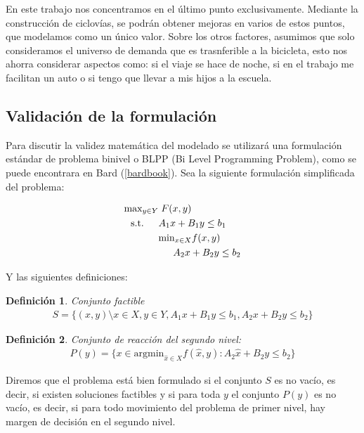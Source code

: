 \documentclass{article}
\newtheorem{definition}{Definición}
\newcommand{\modelspace}{\hspace{1.5em}}
\begin{document}
  En este trabajo nos concentramos en el último punto exclusivamente. Mediante la construcción de ciclovías, se podrán obtener mejoras en varios de estos puntos, que modelamos como un único valor. Sobre los otros factores, asumimos que solo consideramos el universo de demanda que es trasnferible a la bicicleta, esto nos ahorra considerar aspectos como: si el viaje se hace de noche, si en el trabajo me facilitan un auto o si tengo que llevar a mis hijos a la escuela.

  \subsection*{Validación de la formulación}

  Para discutir la validez matemática del modelado se utilizará una formulación estándar de problema binivel o BLPP (Bi Level Programming Problem), como se puede encontrara en Bard (\ref{bardbook}).
  Sea la siguiente formulación simplificada del problema:

  \begin{align}
    \text{max}_{y \in Y}    & \; F(x, y) \\
    \text{s.t.} \modelspace & A_1 x + B_1 y \leq b_1 \\
                            & \text{min}_{x \in X} f(x, y) \\
                            & \modelspace A_2 x + B_2 y \leq b_2
  \end{align}

  Y las siguientes definiciones:

  \begin{definition}
    Conjunto factible
    \begin{align}
      S = \{(x, y) \setminus x \in X, y \in Y, A_1 x + B_1 y \leq b_1, A_2 x + B_2 y \leq b_2 \}
    \end{align}
  \end{definition}

  \begin{definition}
    Conjunto de reacción del segundo nivel:
    \begin{align}
      P(y) = \{ x \in \text{argmin}_{\hat{x} \in X} f(\hat{x}, y) : A_2 \hat{x} + B_2 y \leq b_2 \}
    \end{align}
  \end{definition}

  Diremos que el problema está bien formulado si el conjunto $S$ es no vacío, es decir, si existen soluciones factibles y si para toda $y$ el conjunto $P(y)$ es no vacío, es decir, si para todo movimiento del problema de primer nivel, hay margen de decisión en el segundo nivel.
\end{document}
